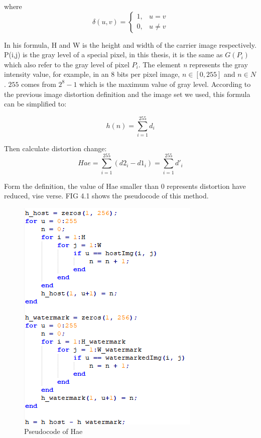 where
$$\delta(u,v) = \begin{cases} 1, & u = v \\ 
0, & u \neq v \end{cases}$$

In his formula, H and W is the height and width of the carrier image respectively. P(i,j) is the gray level of a special pixel, in this thesis, it is the same as \(G(P_{i})\) which also refer to the gray level of  pixel \(P_{i}\). The element \textit{n} represents the gray intensity value, for example, in an 8 bits per pixel image, \(n \in [0,255]\) and \(n\in N\). \(255\) comes from \(2^{8} -1\) which is the maximum value of gray level. According to the previous image distortion definition and the image set we used, this formula can be simplified to:

$$h(n) = \sum_{i=1}^{255} d_{i}$$

Then calculate distortion change:
$$Hae = \sum_{i=1}^{255} (d2_{i} - d1_{i}) = \sum_{i=1}^{255} d'_{i}$$

Form the definition, the value of Hae smaller than 0 represents distortion have reduced, vise verse. FIG 4.1 shows the pseudocode of this method.

\begin{figure}[h]
\includegraphics[width=\columnwidth]{image/Pseudocode_Hae.PNG}
\caption{Pseudocode of Hae}
\label{fig:figure}
\end{figure}   



